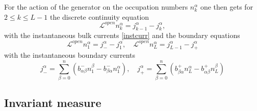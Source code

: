 \documentclass[12pt]{article}
\begin{document}
For the action of the generator on the occupation numbers $n^\alpha_k$ one then gets for $2\leq k \leq L-1$ 
the discrete continuity equation 
\begin{equation}
\mathcal{L}^{open} n^\alpha_{k} = j_{k-1}^\alpha - j_{k}^\alpha,
\label{ceopen}
\end{equation}
with the instantaneous bulk currents \eqref{instcurr}
and the boundary equations
\begin{equation}
\mathcal{L}^{open} n^\alpha_{1} = j_{-}^\alpha - j_1^\alpha, \quad
\mathcal{L}^{open} n^\alpha_{L} = j_{L-1}^\alpha - j_{+}^\alpha
\label{cepm}
\end{equation}
with the instantaneous boundary currents
\begin{equation}
j_{-}^{\alpha} =
\sum_{\beta=0}^n (b_{\alpha\beta}^{-}n^{\beta}_{1} - b_{\beta\alpha}^{-}n^{\alpha}_{1}) , \quad
j_{+}^{\alpha} =
\sum_{\beta=0}^n (b_{\beta\alpha}^{+}n^{\alpha}_{L} - b_{\alpha\beta}^{+}n^{\beta}_{L}) 
\label{instcurboundary}
\end{equation}

\subsection{Invariant measure}
\end{document}
